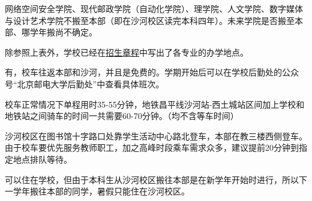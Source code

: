 网络空间安全学院、现代邮政学院（自动化学院）、理学院、人文学院、数字媒体与设计艺术学院不搬至本部（即在沙河校区读完本科四年）。未来学院是否搬至本部、哪学年搬尚不确定。

除参照上表外，学校已经在\href{https://zsb.bupt.edu.cn/info/1005/1992.htm}{招生章程}中写出了各专业的办学地点。


有，校车往返本部和沙河，并且是免费的。学期开始后可以在学校后勤处的公众号“北京邮电大学后勤处”中查看具体班次。

校车正常情况下单程用时35-55分钟，地铁昌平线沙河站-西土城站区间加上学校和地铁站之间骑车的时间一共需要60-70分钟。（均不含等车时间）

沙河校区在图书馆十字路口处靠学生活动中心路北登车，本部在教三楼西侧登车。由于校车要优先服务教师职工，加之高峰时段乘车需求众多，建议提前20分钟到指定地点排队等待。


可以住在学校，但由于本科生从沙河校区搬往本部是在新学年开始时进行，所以下一学年搬往本部的同学，暑假只能住在沙河校区。
